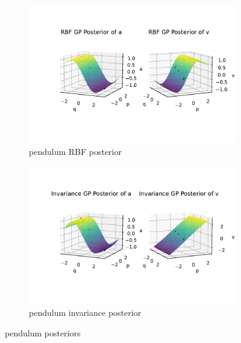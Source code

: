 \documentclass{statsmsc}
\begin{document}
\begin{figure}[H]
     \centering
     \begin{subfigure}[b]{\linewidth}
        \centering
        \includegraphics[width=\linewidth]{../codes/figures/posterior_pendulum_rbf.pdf}
        \caption{pendulum RBF posterior}
        \label{fig:posterior_pendulum_rbf}
     \end{subfigure}
     \hfill
     \begin{subfigure}[b]{\linewidth}
         \centering
         \includegraphics[width=\linewidth]{../codes/figures/posterior_pendulum_invariance.pdf}
         \caption{pendulum invariance posterior}
         \label{fig:posterior_pendulum_invariance}
     \end{subfigure}
        \caption{pendulum posteriors}
        \label{fig:posterior_pendulum}
\end{figure}
\end{document}
